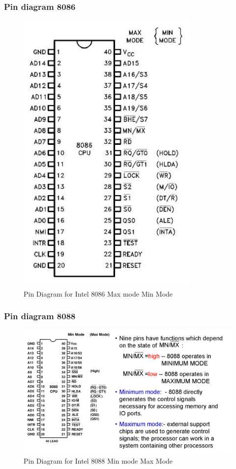 \subsubsection{Pin diagram 8086}
\begin{figure}[h!]
    \centering
    \includegraphics[width = 0.8\textwidth]{./figures/8086_MaxMode.jpg}
    \caption{Pin Diagram for Intel 8086 Max mode {Min Mode}}
    \label{fig:bl}
\end{figure}

\subsubsection{Pin diagram 8088}
\begin{figure}[h!]
    \centering
    \includegraphics[width = 1.5\textwidth]{./figures/8088_MinMode.png}
    \caption{Pin Diagram for Intel 8088 Min mode {Max Mode}}
    \label{fig:bl}
\end{figure}

